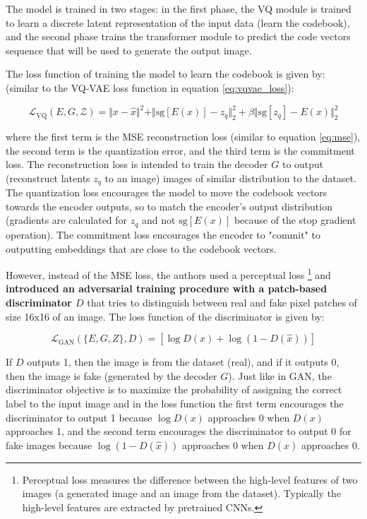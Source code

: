 The model is trained in two stages: in the first phase, the VQ module is trained to learn a discrete latent representation of the input data (learn the codebook), and the second phase trains the transformer module to predict the code vectors sequence that will be used to generate the output image.

The loss function of training the model to learn the codebook is given by: (similar to the VQ-VAE loss function in equation \ref{eq:vqvae_loss}):

\begin{equation}
    \mathcal{L}_{\text{VQ}} (E, G, \mathcal{Z}) = \Vert x - \hat{x} \Vert ^2 + \Vert \text{sg}[E(x)] - z_q \Vert ^2_2 +  \beta \Vert \text{sg}[z_q] - E(x) \Vert ^2_2
\end{equation}

where the first term is the MSE reconstruction loss (similar to equation \ref{eq:mse}), the second term is the quantization error, and the third term is the commitment loss. The reconstruction loss is intended to train the decoder $G$ to output (reconstruct latents $z_q$ to an image) images of similar distribution to the dataset. The quantization loss encourages the model to move the codebook vectors towards the encoder outputs, so to match the encoder's output distribution (gradients are calculated for $z_q$ and not $\text{sg}[E(x)]$ because of the stop gradient operation). The commitment loss encourages the encoder to "commit" to outputting embeddings that are close to the codebook vectors.

However, instead of the MSE loss, the authors used a perceptual loss \cite{perceptual_loss} \footnote[4]{Perceptual loss measures the difference between the high-level features of two images (a generated image and an image from the dataset). Typically the high-level features are extracted by pretrained CNNs.} and \textbf{introduced an adversarial training procedure with a patch-based discriminator $D$} that tries to distinguish between real and fake pixel patches of size 16x16 of an image. The loss function of the discriminator is given by:

\begin{equation}
    \mathcal{L}_{\text{GAN}}(\{E,G,Z\}, D) = [\log D(x) + \log (1-D(\hat{x}))]
\end{equation}

If $D$ outputs 1, then the image is from the dataset (real), and if it outputs 0, then the image is fake (generated by the decoder $G$). Just like in GAN, the discriminator objective is to maximize the probability of assigning the correct label to the input image and in the loss function the first term encourages the discriminator to output 1 because $\log D(x)$ approaches 0 when $D(x)$ approaches 1, and the second term encourages the discriminator to output 0 for fake images because $\log (1-D(\hat{x}))$ approaches 0 when $D(\hat{x})$ approaches 0.

